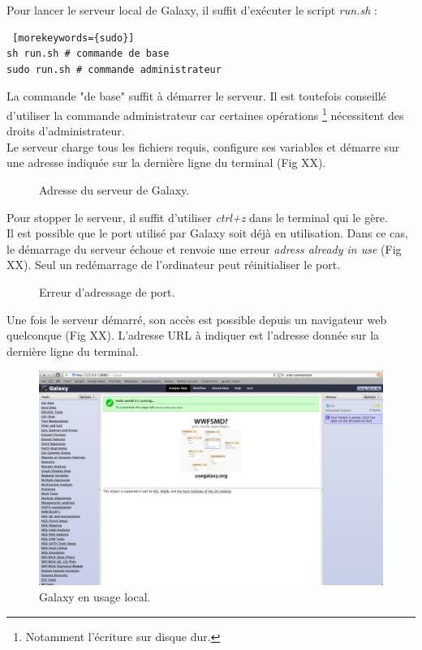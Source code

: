 Pour lancer le serveur local de Galaxy, il suffit d'exécuter le script \textit{run.sh} : 
\lstset{language=sh}
\begin{lstlisting} [morekeywords={sudo}]
sh run.sh # commande de base
sudo run.sh # commande administrateur
 \end{lstlisting} 
 
 La commande "de base" suffit à démarrer le serveur. Il est toutefois conseillé d'utiliser la commande administrateur car certaines opérations \footnote{Notamment l'écriture sur disque dur.} nécessitent des droits d'administrateur.\\
 
 Le serveur charge tous les fichiers requis, configure ses variables et démarre sur une adresse indiquée sur la dernière ligne du terminal (Fig XX).
 
 \begin{figure}[!h]
 \centering
{}
\caption{Adresse du serveur de Galaxy.}
\end{figure}

Pour stopper le serveur, il suffit d'utiliser \textit{ctrl+z} dans le terminal qui le gère.\\

Il est possible que le port utilisé par Galaxy soit déjà en utilisation. Dans ce cas, le démarrage du serveur échoue et renvoie une erreur \textit{adress already in use} (Fig XX). Seul un redémarrage de l'ordinateur peut réinitialiser le port.

 \begin{figure}[!h]
 \centering
{}
\caption{Erreur d'adressage de port.}
\end{figure}
\newpage
Une fois le serveur démarré, son accès est possible depuis un navigateur web quelconque (Fig XX). L'adresse URL à indiquer est l'adresse donnée sur la dernière ligne du terminal.

 \begin{figure}[!h]
 \centering
\includegraphics[scale=0.35]{Images/Galaxylocal.png}
\caption{Galaxy en usage local.}
\end{figure}
